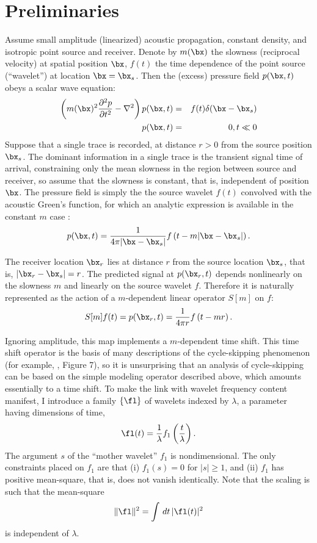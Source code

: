 \section{Preliminaries}
Assume small amplitude (linearized) acoustic propagation, constant
density, and isotropic point source and receiver. Denote by $m(\bx)$
the slowness (reciprocal velocity) at spatial position $\bx$, $f(t)$
the time dependence of the point source (``wavelet'') at location
$\bx=\bx_s$. Then the (excess) pressure field $p(\bx,t)$ obeys a
scalar wave equation:
\begin{eqnarray}
  \label{eqn:awe}
  \left(m(\bx)^2\frac{\partial^2 p}{\partial t^2} - \nabla^2\right) p(\bx,t) &=&
                                                                         f(t)\delta(\bx-\bx_s) \nonumber\\
  p(\bx,t)&=&0, t\ll 0
\end{eqnarray}
Suppose that a single trace is recorded, at distance $r>0$ from the
source position $\bx_s$. The dominant information in a single
trace is the transient signal time of arrival, constraining only the mean slowness in the
region
between source and receiver, so assume that the
slowness is constant, that is, independent of position $\bx$. The pressure field is simply the  the source
wavelet $f(t)$ convolved with the
acoustic Green's function, for which an analytic expression is
available in the constant $m$ case \cite[]{CourHil:62}:
\begin{equation}
  \label{eqn:homsol}
  p(\bx,t) = \frac{1}{4\pi |\bx-\bx_s|}f\left(t-m|\bx-\bx_s|\right).
\end{equation}

The receiver location $\bx_r$ lies at distance $r$ from the source
location $\bx_s$, that is, $|\bx_r-\bx_s|=r$. The predicted signal at
$p(\bx_r,t)$ depends nonlinearly on the slowness $m$ and linearly on the
source wavelet $f$. Therefore it is naturally represented as the
action of a $m$-dependent linear operator $S[m]$ on $f$:
\begin{equation}
\label{eqn:mod}
S[m]f (t)= p(\bx_r,t) = \frac{1}{4\pi r}f\left(t-mr\right).
\end{equation}

Ignoring amplitude, this map implements a $m$-dependent time
shift. This time shift operator is the basis of many descriptions of
the cycle-skipping phenomenon (for example, \cite{VirieuxOperto:09},
Figure 7), so it is unsurprising that an analysis of cycle-skipping
can be based on the simple modeling operator described above, which
amounts essentially to a time shift. To make the link with wavelet
frequency content manifest, I introduce a family $\{\fl\}$ of
wavelets indexed by $\lambda$, a parameter having dimensions of time,
\begin{equation}
  \label{eqn:deffl}
  \fl(t) = \frac{1}{\lambda}f_1\left(\frac{t}{\lambda}\right).
\end{equation}
The argument $s$ of the ``mother wavelet'' $f_1$ is
nondimensional. The only constraints placed on $f_1$ are that (i) 
$f_1(s)=0$ for $|s|\ge 1$, and (ii) $f_1$  has positive
mean-square, that is, does not vanish identically. Note that
the scaling is such that the mean-square
\[
  \|\fl\|^2 = \int\,dt\,|\fl(t)|^2
\]
is independent of $\lambda$.

